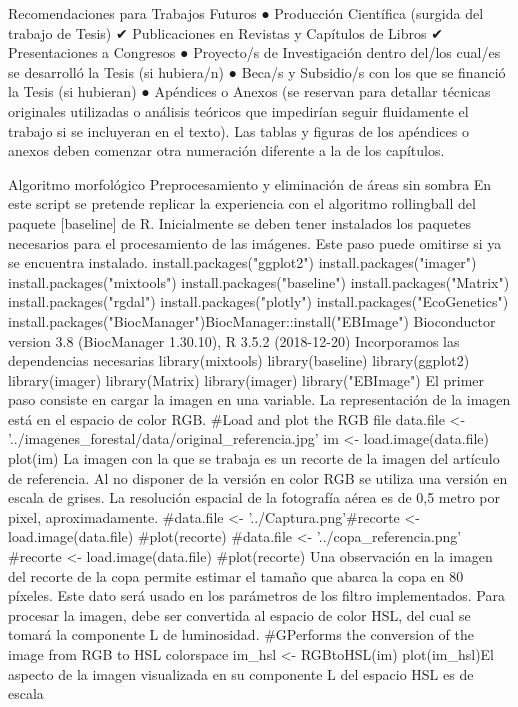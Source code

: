 Recomendaciones para Trabajos Futuros
●	Producción Científica (surgida del trabajo de Tesis)
✔	Publicaciones en Revistas y Capítulos de Libros
✔	Presentaciones a Congresos
●	Proyecto/s de Investigación dentro del/los cual/es se desarrolló la Tesis (si hubiera/n)
●	Beca/s y Subsidio/s con los que se financió la Tesis (si hubieran)
●	Apéndices o Anexos (se reservan para detallar técnicas originales utilizadas o análisis teóricos que impedirían seguir fluidamente el trabajo si se incluyeran en el texto). Las tablas y figuras de los apéndices o anexos deben comenzar otra numeración diferente a la de los capítulos.

Algoritmo morfológico
Preprocesamiento y eliminación de áreas sin sombra
En este script se pretende replicar la experiencia con el algoritmo rollingball del paquete
[baseline] de R.
Inicialmente se deben tener instalados los paquetes necesarios para el procesamiento de
las imágenes.
Este paso puede omitirse si ya se encuentra instalado.
install.packages("ggplot2")
install.packages("imager")
install.packages("mixtools")
install.packages("baseline")
install.packages("Matrix")
install.packages("rgdal")
install.packages("plotly")
install.packages("EcoGenetics")
install.packages("BiocManager")BiocManager::install("EBImage")
Bioconductor version 3.8 (BiocManager 1.30.10), R 3.5.2 (2018-12-20)
Incorporamos las dependencias necesarias
library(mixtools)
library(baseline)
library(ggplot2)
library(imager)
library(Matrix)
library(imager)
library("EBImage")
El primer paso consiste en cargar la imagen en una variable. La representación de la
imagen está en el espacio de color RGB.
#Load and plot the RGB file
data.file <- '../imagenes_forestal/data/original_referencia.jpg'
im <- load.image(data.file)
plot(im)
La imagen con la que se trabaja es un recorte de la imagen del artículo de referencia. Al
no disponer de la versión en color RGB se utiliza  una versión en escala de grises.
La resolución espacial de la fotografía aérea es de 0,5 metro por pixel,
aproximadamente.
#data.file <- '../Captura.png'#recorte <- load.image(data.file)
#plot(recorte)
#data.file <- '../copa_referencia.png'
#recorte <- load.image(data.file)
#plot(recorte)
Una observación en la imagen del recorte de la copa permite estimar el tamaño que
abarca la copa en 80 píxeles. Este dato será usado en los parámetros de los filtro
implementados.
Para procesar la imagen, debe ser convertida al espacio de color  HSL, del cual se
tomará la componente L de luminosidad.
#GPerforms the conversion of the image from RGB to HSL colorspace
im_hsl <- RGBtoHSL(im)
plot(im_hsl)El aspecto de la imagen visualizada en su componente L del espacio HSL es de escala
